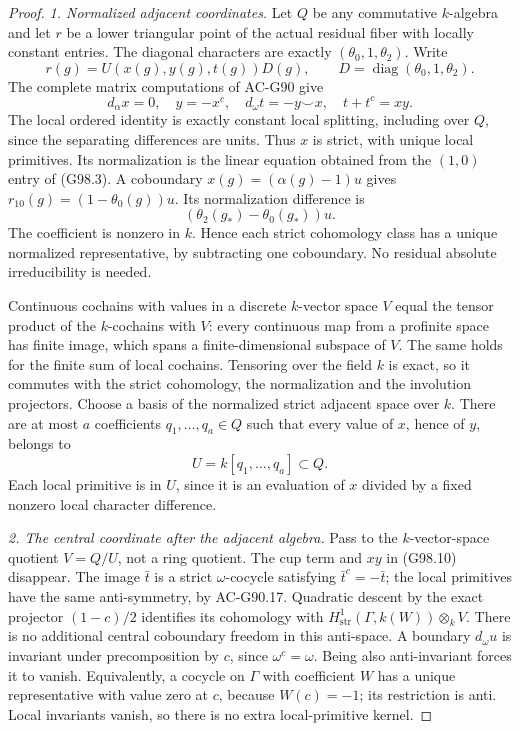\begin{proof}
\emph{1. Normalized adjacent coordinates.}
Let $Q$ be any commutative $k$-algebra and let $r$ be a lower
triangular point of the actual residual fiber with locally constant
entries.  The diagonal characters are exactly
$(\theta_0,1,\theta_2)$.  Write
\[
 r(g)=U(x(g),y(g),t(g))D(g),\qquad
 D=\operatorname{diag}(\theta_0,1,\theta_2).
 \tag{G98.9}
\]
The complete matrix computations of AC-G90 give
\[
 d_\alpha x=0,\quad y=-x^c,\quad
 d_\omega t=-y\smile x,\quad t+t^c=xy.
 \tag{G98.10}
\]
The local ordered identity is exactly constant local splitting,
including over $Q$, since the separating differences are units.
Thus $x$ is strict, with unique local primitives.  Its normalization
is the linear equation obtained from the $(1,0)$ entry of (G98.3).
A coboundary $x(g)=(\alpha(g)-1)u$ gives
$r_{10}(g)=(1-\theta_0(g))u$.  Its normalization difference is
\[
                    (\theta_2(g_*)-\theta_0(g_*))u.
 \tag{G98.11}
\]
The coefficient is nonzero in $k$.  Hence each strict cohomology
class has a unique normalized representative, by subtracting
one coboundary.  No residual absolute irreducibility is needed.

Continuous cochains with values in a discrete $k$-vector space
$V$ equal the tensor product of the $k$-cochains with $V$:
every continuous map from a profinite space has finite image,
which spans a finite-dimensional subspace of $V$.
The same holds for the finite sum of local cochains.
Tensoring over the field $k$ is exact, so it commutes with the
strict cohomology, the normalization and the involution projectors.
Choose a basis of the normalized strict adjacent space over $k$.
There are at most $a$ coefficients $q_1,\ldots,q_a\in Q$
such that every value of $x$, hence of $y$, belongs to
\[
                         U=k[q_1,\ldots,q_a]\subset Q.
 \tag{G98.12}
\]
Each local primitive is in $U$, since it is an evaluation of $x$
divided by a fixed nonzero local character difference.

\emph{2. The central coordinate after the adjacent algebra.}
Pass to the $k$-vector-space quotient $V=Q/U$, not a ring quotient.
The cup term and $xy$ in (G98.10) disappear.  The image $\bar t$
is a strict $\omega$-cocycle satisfying
$\bar t^c=-\bar t$; the local primitives have the same anti-symmetry,
by AC-G90.17.  Quadratic descent by the exact projector
$(1-c)/2$ identifies its cohomology with
$H^1_{\mathrm{str}}(\Gamma,k(W))\otimes_kV$.
There is no additional central coboundary freedom in this
anti-space.  A boundary $d_\omega u$ is invariant under
precomposition by $c$, since $\omega^c=\omega$.
Being also anti-invariant forces it to vanish.  Equivalently,
a cocycle on $\Gamma$ with coefficient $W$ has a unique representative
with value zero at $c$, because $W(c)=-1$; its restriction is anti.
Local invariants vanish, so there is no extra local-primitive kernel.


\end{proof}
